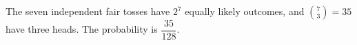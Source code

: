 The seven independent fair tosses have $2^7$ equally likely outcomes, and $\binom73=35$ have three heads. The probability is $\boxed{\dfrac{35}{128}}$.
